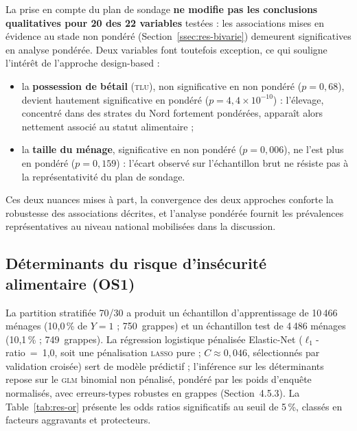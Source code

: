 La prise en compte du plan de sondage \textbf{ne modifie pas les conclusions
qualitatives pour 20 des 22 variables} testées : les associations mises en
évidence au stade non pondéré (Section~\ref{ssec:res-bivarie}) demeurent
significatives en analyse pondérée. Deux variables font toutefois exception, ce
qui souligne l'intérêt de l'approche design-based :

\begin{itemize}
  \item la \textbf{possession de bétail} (\textsc{tlu}), non significative en
        non pondéré ($p = 0{,}68$), devient hautement significative en pondéré
        ($p = 4{,}4\times10^{-10}$) : l'élevage, concentré dans des strates du
        Nord fortement pondérées, apparaît alors nettement associé au statut
        alimentaire ;
  \item la \textbf{taille du ménage}, significative en non pondéré ($p = 0{,}006$),
        ne l'est plus en pondéré ($p = 0{,}159$) : l'écart observé sur
        l'échantillon brut ne résiste pas à la représentativité du plan de
        sondage.
\end{itemize}

Ces deux nuances mises à part, la convergence des deux approches conforte la
robustesse des associations décrites, et l'analyse pondérée fournit les
prévalences représentatives au niveau national mobilisées dans la discussion.

\subsection{Déterminants du risque d'insécurité alimentaire (OS1)}
\label{ssec:res-os1}

La partition stratifiée 70/30 a produit un échantillon d'apprentissage de
10\,466 ménages (10,0\,\% de $Y=1$ ; 750~grappes) et un échantillon test de
4\,486 ménages (10,1\,\% ; 749~grappes). La régression logistique pénalisée
Elastic-Net ($\ell_1$-ratio~=~1,0, soit une pénalisation \textsc{lasso} pure ;
$C \approx 0{,}046$, sélectionnés par validation croisée) sert de modèle
prédictif ; l'inférence sur les déterminants repose sur
le \textsc{glm} binomial non pénalisé, pondéré par les poids d'enquête
normalisés, avec erreurs-types robustes en grappes (Section~4.5.3). La
Table~\ref{tab:res-or} présente les odds ratios significatifs au seuil de
5\,\%, classés en facteurs aggravants et protecteurs.


